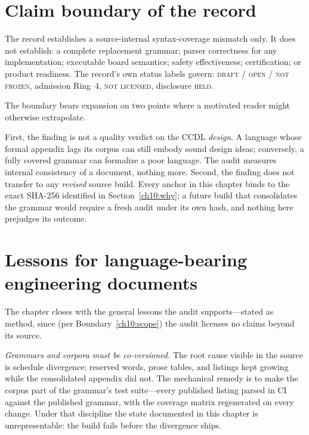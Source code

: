\section{Claim boundary of the record}\label{ch10:record-boundary}

\begin{boundary}\label{ch10:boundary-record}
The record establishes a source-internal syntax-coverage mismatch only. It does not establish: a complete replacement grammar; parser correctness for any implementation; executable board semantics; safety effectiveness; certification; or product readiness. The record's own status labels govern: \textsc{draft / open / not frozen}, admission Ring~4, \textsc{not licensed}, disclosure \textsc{held}.
\end{boundary}

The boundary bears expansion on two points where a motivated reader might otherwise extrapolate.

First, the finding is not a quality verdict on the CCDL \emph{design}. A language whose formal appendix lags its corpus can still embody sound design ideas; conversely, a fully covered grammar can formalize a poor language. The audit measures internal consistency of a document, nothing more. Second, the finding does not transfer to any \emph{revised} source build. Every anchor in this chapter binds to the exact SHA-256 identified in Section~\ref{ch10:why}; a future build that consolidates the grammar would require a fresh audit under its own hash, and nothing here prejudges its outcome.

\section{Lessons for language-bearing engineering documents}\label{ch10:lessons}

The chapter closes with the general lessons the audit supports---stated as method, since (per Boundary~\ref{ch10:scope}) the audit licenses no claims beyond its source.

\emph{Grammars and corpora must be co-versioned.} The root cause visible in the source is schedule divergence: reserved words, prose tables, and listings kept growing while the consolidated appendix did not. The mechanical remedy is to make the corpus part of the grammar's test suite---every published listing parsed in CI against the published grammar, with the coverage matrix regenerated on every change. Under that discipline the state documented in this chapter is unrepresentable: the build fails before the divergence ships.

